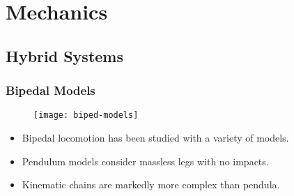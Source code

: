 \section{Mechanics}
\showtoc

\subsection{Hybrid Systems}
\begin{frame}[t]
  \frametitle{Bipedal Models}
  \begin{figure}
    \centering
    \texttt{[image: biped-models]}
  \end{figure}
  \begin{itemize}
  \item Bipedal locomotion has been studied with a variety of models.
  \item Pendulum models consider massless legs with no impacts.
  \item Kinematic chains are markedly more complex than pendula.
  \end{itemize}
\end{frame}

